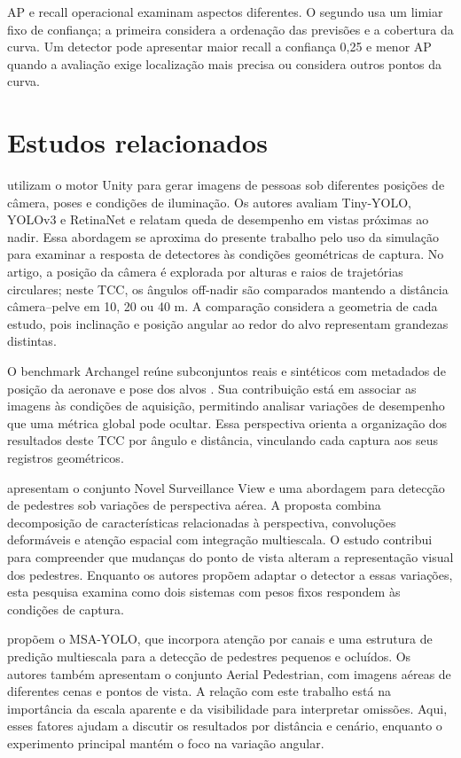 AP e recall operacional examinam aspectos diferentes. O segundo usa um limiar fixo de confiança; a primeira considera a ordenação das previsões e a cobertura da curva. Um detector pode apresentar maior recall a confiança 0,25 e menor AP quando a avaliação exige localização mais precisa ou considera outros pontos da curva.

\section{Estudos relacionados}
 utilizam o motor Unity para gerar imagens de pessoas sob diferentes posições de câmera, poses e condições de iluminação. Os autores avaliam Tiny-YOLO, YOLOv3 e RetinaNet e relatam queda de desempenho em vistas próximas ao nadir. Essa abordagem se aproxima do presente trabalho pelo uso da simulação para examinar a resposta de detectores às condições geométricas de captura. No artigo, a posição da câmera é explorada por alturas e raios de trajetórias circulares; neste TCC, os ângulos off-nadir são comparados mantendo a distância câmera--pelve em 10, 20 ou 40 m. A comparação considera a geometria de cada estudo, pois inclinação e posição angular ao redor do alvo representam grandezas distintas.

O benchmark Archangel reúne subconjuntos reais e sintéticos com metadados de posição da aeronave e pose dos alvos \cite{shen2023archangel}. Sua contribuição está em associar as imagens às condições de aquisição, permitindo analisar variações de desempenho que uma métrica global pode ocultar. Essa perspectiva orienta a organização dos resultados deste TCC por ângulo e distância, vinculando cada captura aos seus registros geométricos.

 apresentam o conjunto Novel Surveillance View e uma abordagem para detecção de pedestres sob variações de perspectiva aérea. A proposta combina decomposição de características relacionadas à perspectiva, convoluções deformáveis e atenção espacial com integração multiescala. O estudo contribui para compreender que mudanças do ponto de vista alteram a representação visual dos pedestres. Enquanto os autores propõem adaptar o detector a essas variações, esta pesquisa examina como dois sistemas com pesos fixos respondem às condições de captura.

 propõem o MSA-YOLO, que incorpora atenção por canais e uma estrutura de predição multiescala para a detecção de pedestres pequenos e ocluídos. Os autores também apresentam o conjunto Aerial Pedestrian, com imagens aéreas de diferentes cenas e pontos de vista. A relação com este trabalho está na importância da escala aparente e da visibilidade para interpretar omissões. Aqui, esses fatores ajudam a discutir os resultados por distância e cenário, enquanto o experimento principal mantém o foco na variação angular.

